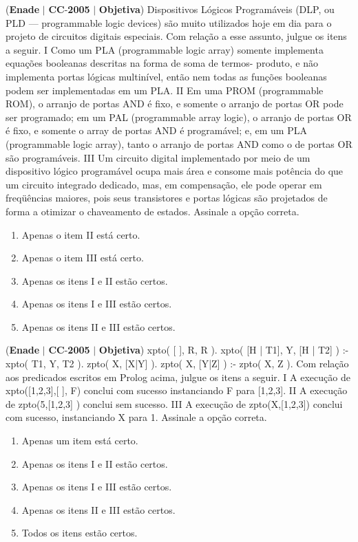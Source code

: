 \documentclass{exam}
\begin{document}
\begin{questions}
\question (\textbf{Enade} $|$ \textbf{CC}-\textbf{2005} $|$ \textbf{Objetiva})
Dispositivos Lógicos Programáveis (DLP, ou PLD — programmable
logic devices) são muito utilizados hoje em dia para o projeto de
circuitos digitais especiais. Com relação a esse assunto, julgue os
itens a seguir.
I Como um PLA (programmable logic array) somente implementa
equações booleanas descritas na forma de soma de termos-
produto, e não implementa portas lógicas multinível, então nem
todas as funções booleanas podem ser implementadas em um
PLA.
II Em uma PROM (programmable ROM), o arranjo de portas AND
é fixo, e somente o arranjo de portas OR pode ser programado; em
um PAL (programmable array logic), o arranjo de portas OR é
fixo, e somente o array de portas AND é programável; e, em um
PLA (programmable logic array), tanto o arranjo de portas AND
como o de portas OR são programáveis.
III Um circuito digital implementado por meio de um dispositivo
lógico programável ocupa mais área e consome mais potência do
que um circuito integrado dedicado, mas, em compensação, ele
pode operar em freqüências maiores, pois seus transistores e
portas lógicas são projetados de forma a otimizar o chaveamento
de estados.
Assinale a opção correta.
	\begin{enumerate}[label=\alph*)]
		\item  Apenas o item II está certo.
		\item  Apenas o item III está certo.
		\item  Apenas os itens I e II estão certos.
		\item  Apenas os itens I e III estão certos.
		\item  Apenas os itens II e III estão certos.
	\end{enumerate}

\question (\textbf{Enade} $|$ \textbf{CC}-\textbf{2005} $|$ \textbf{Objetiva})
xpto( [ ], R, R ).
xpto( [H | T1], Y, [H | T2] ) :- xpto( T1, Y, T2 ).
zpto( X, [X|Y] ).
zpto( X, [Y|Z] ) :- zpto( X, Z ).
Com relação aos predicados escritos em Prolog acima, julgue os
itens a seguir.
I A execução de xpto([1,2,3],[ ], F) conclui com sucesso
instanciando F para [1,2,3].
II A execução de zpto(5,[1,2,3] ) conclui sem sucesso.
III A execução de zpto(X,[1,2,3]) conclui com sucesso,
instanciando X para 1.
Assinale a opção correta.
	\begin{enumerate}[label=\alph*)]
		\item  Apenas um item está certo.
		\item  Apenas os itens I e II estão certos.
		\item  Apenas os itens I e III estão certos.
		\item  Apenas os itens II e III estão certos.
		\item  Todos os itens estão certos.
	\end{enumerate}


\end{questions}
\end{document}
